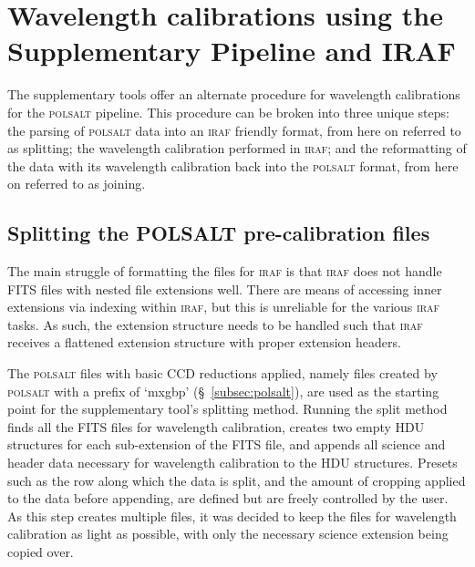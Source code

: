 

\section{Wavelength calibrations using the Supplementary Pipeline and IRAF} \label{sec:mod_tools}

The supplementary tools offer an alternate procedure for wavelength calibrations for the \textsc{polsalt} pipeline. This procedure can be broken into three unique steps: the parsing of \textsc{polsalt} data into an \textsc{iraf} friendly format, from here on referred to as splitting; the wavelength calibration performed in \textsc{iraf}; and the reformatting of the data with its wavelength calibration back into the \textsc{polsalt} format, from here on referred to as joining.

\subsection{Splitting the POLSALT pre-calibration files}

The main struggle of formatting the files for \textsc{iraf} is that \textsc{iraf} does not handle \gls{FITS} files with nested file extensions well. There are means of accessing inner extensions via indexing within \textsc{iraf}, but this is unreliable for the various \textsc{iraf} tasks. As such, the extension structure needs to be handled such that \textsc{iraf} receives a flattened extension structure with proper extension headers.
\prgph

The \textsc{polsalt} files with basic \gls{CCD} reductions applied, namely files created by \textsc{polsalt} with a prefix of `mxgbp' (\S~\ref{subsec:polsalt}), are used as the starting point for the supplementary tool's splitting method. Running the split method finds all the \gls{FITS} files for wavelength calibration, creates two empty \gls{HDU} structures for each sub-extension of the \gls{FITS} file, and appends all science and header data necessary for wavelength calibration to the \gls{HDU} structures. Presets such as the row along which the data is split, and the amount of cropping applied to the data before appending, are defined but are freely controlled by the user. As this step creates multiple files, it was decided to keep the files for wavelength calibration as light as possible, with only the necessary science extension being copied over.

